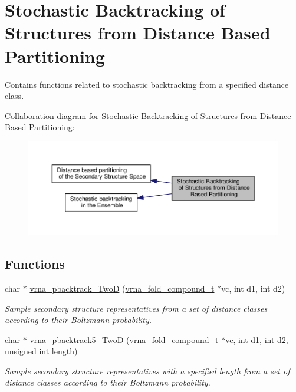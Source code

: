 \hypertarget{group__kl__neighborhood__stochbt}{\section{Stochastic Backtracking of Structures from Distance Based Partitioning}
\label{group__kl__neighborhood__stochbt}
}


Contains functions related to stochastic backtracking from a specified distance class.  


Collaboration diagram for Stochastic Backtracking of Structures from Distance Based Partitioning\-:
\nopagebreak
\begin{figure}[H]
\begin{center}
\leavevmode
\includegraphics[width=350pt]{group__kl__neighborhood__stochbt}
\end{center}
\end{figure}
\subsection*{Functions}
\begin{DoxyCompactItemize}
\item 
char $\ast$ \hyperlink{group__kl__neighborhood__stochbt_ga14aceef73f83bbde77bb3a0ca06c9d13}{vrna\-\_\-pbacktrack\-\_\-\-Two\-D} (\hyperlink{group__fold__compound_ga1b0cef17fd40466cef5968eaeeff6166}{vrna\-\_\-fold\-\_\-compound\-\_\-t} $\ast$vc, int d1, int d2)
\begin{DoxyCompactList}\small\item\em Sample secondary structure representatives from a set of distance classes according to their Boltzmann probability. \end{DoxyCompactList}\item 
char $\ast$ \hyperlink{group__kl__neighborhood__stochbt_ga6504913303bc325659c365d5f59b41e0}{vrna\-\_\-pbacktrack5\-\_\-\-Two\-D} (\hyperlink{group__fold__compound_ga1b0cef17fd40466cef5968eaeeff6166}{vrna\-\_\-fold\-\_\-compound\-\_\-t} $\ast$vc, int d1, int d2, unsigned int length)
\begin{DoxyCompactList}\small\item\em Sample secondary structure representatives with a specified length from a set of distance classes according to their Boltzmann probability. \end{DoxyCompactList}\end{DoxyCompactItemize}


